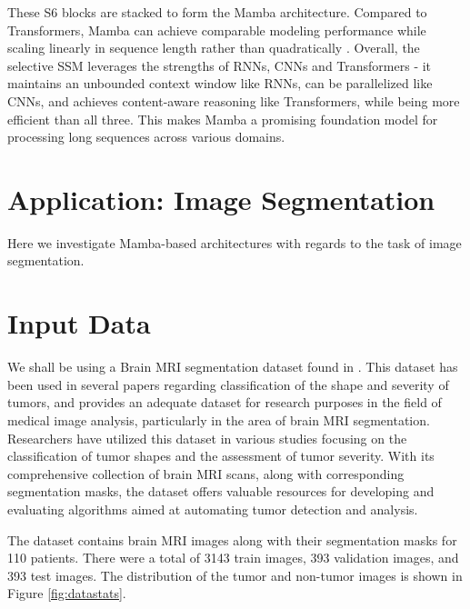 \documentclass[conference]{IEEEtran}
\begin{document}
These S6 blocks are stacked to form the Mamba architecture. Compared to Transformers, Mamba can achieve comparable modeling performance while scaling linearly in sequence length rather than quadratically \cite{gu2023mamba}. Overall, the selective SSM leverages the strengths of RNNs, CNNs and Transformers - it maintains an unbounded context window like RNNs, can be parallelized like CNNs, and achieves content-aware reasoning like Transformers, while being more efficient than all three. This makes Mamba a promising foundation model for processing long sequences across various domains.

\section{Application: Image Segmentation}
Here we investigate Mamba-based architectures with regards to the task of image segmentation.

\section{Input Data}\label{sec2}
We shall be using a Brain MRI segmentation dataset found in \cite{dataset}. This dataset has been used in several papers regarding classification of the shape and severity of tumors, and provides an adequate dataset for research purposes in the field of medical image analysis, particularly in the area of brain MRI segmentation. Researchers have utilized this dataset in various studies focusing on the classification of tumor shapes and the assessment of tumor severity. With its comprehensive collection of brain MRI scans, along with corresponding segmentation masks, the dataset offers valuable resources for developing and evaluating algorithms aimed at automating tumor detection and analysis.

The dataset contains brain MRI images along with their segmentation masks for 110 patients. There were a total of 3143 train images, 393 validation images, and 393 test images. The distribution of the tumor and non-tumor images is shown in Figure \ref{fig:datastats}.
\end{document}
